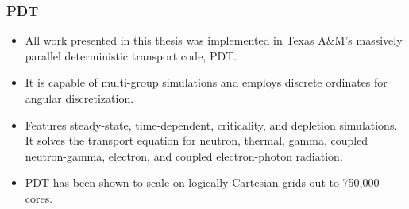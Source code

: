 \documentclass[]{beamer}
\begin{document}
\begin{frame}[t]\frametitle{PDT}
	\begin{block}{}
	\begin{itemize}
		\item All work presented in this thesis was implemented in Texas A\&M's massively parallel deterministic transport code, PDT. 
		\item It is capable of multi-group simulations and employs discrete ordinates for angular discretization.
		\item Features steady-state, time-dependent, criticality, and depletion simulations. It solves the transport equation for neutron, thermal, gamma, coupled neutron-gamma, electron, and coupled electron-photon radiation.
		\item  PDT  has been shown to scale on logically Cartesian grids out to 750,000 cores.
		\end{itemize}
	\end{block}
\end{frame}
\end{document}
